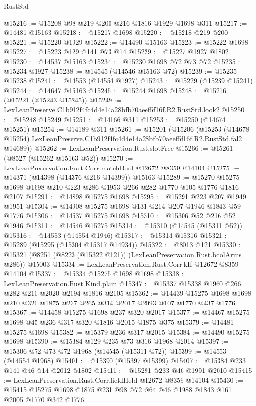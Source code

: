 \begin{lexlean}{RustStd}
\begin{coremodule}
@15216 := @15208 @98 @219 @200 @216 @1816 @1929 @1698 @311
@15217 := @14481 @15163
@15218 := @15217 @1698
@15220 := @15218 @219 @200
@15221 := @15220 @1929
@15222 := @14490 @15163
@15223 := @15222 @1698
@15227 := @15223 @129 @141 @73 @14
@15229 := @15227 @1927 @1802
@15230 := @14537 @15163
@15234 := @15230 @1698 @72 @73 @72
@15235 := @15234 @1927
@15238 := @14545 (@14546 @15163 @72)
@15239 := @15235 @15238
@15241 := @14553 (@14554 @1927)
@15243 := @15229 (@15239 @15241)
@15244 := @14647 @15163
@15245 := @15244 @1698
@15248 := @15216 (@15221 (@15243 @15245))
@15249 := LexLeanPreserve.C1b912f4fc4d4e14a28bfb70aeef5f16f.R2.RustStd.look2
@15250 := @15248 @15249
@15251 := @14166 @311
@15253 := @15250 (@14674 @15251)
@15254 := @14189 @311
@15261 := @15201
    (@15206
      (@15253
        (@14678 @15254)
        LexLeanPreserve.C1b912f4fc4d4e14a28bfb70aeef5f16f.R2.RustStd.fal2
        @14689))
@15262 := LexLeanPreservation.Rust.slotFree
@15266 := @15261 (@8527 (@15262 @15163 @52))
@15270 := LexLeanPreservation.Rust.Corr.matchBool @12672 @8359 @14104
@15275 := @14371 (@14398 (@14376 @216 @14399)) @15163
@15289 := @15270 @15275 @1698 @1698 @210 @223 @286 @1953 @266 @282 @1770 @105 @1776 @1816 @2107
@15291 := @14898 @15275 @1698
@15295 := @15291 @223 @207 @1949 @1951
@15304 := @14908 @15275 @1698 @131 @214 @207 @1946 @1843 @59 @1776
@15306 := @14537 @15275 @1698
@15310 := @15306 @52 @216 @52 @1946
@15311 := @14546 @15275
@15314 := @15310 (@14545 (@15311 @52))
@15316 := @14553 (@14554 @1946)
@15317 := @15314 @15316
@15321 := @15289 (@15295 (@15304 @15317 @14934))
@15322 := @8013 @121
@15330 := @15321 (@8251 (@8223 (@15322 @121)) (LexLeanPreservation.Rust.boolArms @286)) @15003
@15334 := LexLeanPreservation.Rust.Corr.kIf @12672 @8359 @14104
@15337 := @15334 @15275 @1698 @1698
@15338 := LexLeanPreservation.Rust.Kind.plain
@15347 := @15337 @15338 @1960 @266 @282 @210 @2020 @2094 @1816 @2105
@15362 := @14439 @15275 @1698 @1698 @210 @320 @1875 @237 @265 @314 @2017 @2093 @107 @1770 @437 @1776
@15367 := @14458 @15275 @1698 @237 @320 @2017
@15377 := @14467 @15275 @1698 @45 @236 @317 @320 @1816 @2015 @1875 @375
@15379 := @14481 @15275 @1698
@15382 := @15379 @236 @317 @2015
@15384 := @14490 @15275 @1698
@15390 := @15384 @129 @235 @73 @316 @1968 @2014
@15397 := @15306 @72 @73 @72 @1968 (@14545 (@15311 @72))
@15399 := @14553 (@14554 @1968)
@15401 := @15390 (@15397 @15399)
@15407 := @15384 @233 @141 @46 @14 @2012 @1802
@15411 := @15291 @233 @46 @1991 @2010
@15415 := LexLeanPreservation.Rust.Corr.fieldHeld @12672 @8359 @14104
@15430 := @15415 @15275 @1698 @1875 @231 @98 @72 @64 @46 @1988 @1843 @161 @2005 @1770 @342 @1776

\end{coremodule}
\end{lexlean}
